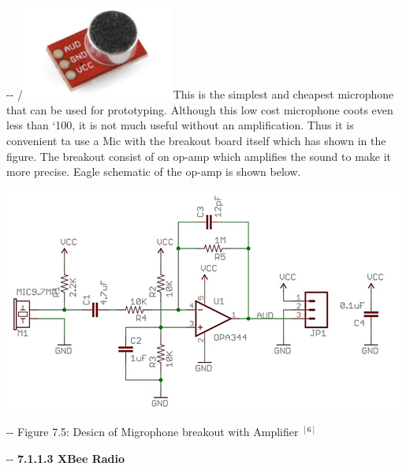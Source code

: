 \documentclass[12pt]{article}
\makeatletter
\newenvironment{indentation}[3]%
	{\par\setlength{\parindent}{#3}
	\setlength{\leftmargin}{#1}       \setlength{\rightmargin}{#2}%
	\advance\linewidth -\leftmargin       \advance\linewidth -\rightmargin%
	\advance\@totalleftmargin\leftmargin  \@setpar{{\@@par}}%
	\parshape 1\@totalleftmargin \linewidth\ignorespaces}{\par}%
\makeatother
\begin{document}
\begin{indentation}{0pt}{0pt}{0pt}
{\small /}\includegraphics[width=143pt]{img-35.png}\textbf{{\large  }}This is
the simplest and cheapest microphone that can be used for prototyping. Although
this low cost microphone coots even less than `100, it is not much useful without
an amplification. Thus it is convenient ta use a Mic with the breakout board itself
which has shown in the figure. The breakout consist of on op-amp which amplifies
the sound to make it more precise. Eagle schematic of the op-amp is shown below.
\end{indentation}
\includegraphics[width=374pt]{img-20.png}
\begin{center}
\begin{indentation}{0pt}{0pt}{0pt}
Figure 7.5: Desicn of Migrophone breakout with Amplifier
$^{[6]}$

\end{indentation}
\end{center}

\begin{indentation}{0pt}{0pt}{0pt}
\textbf{7.1.1.3 XBee Radio}
\end{indentation}
\end{document}
